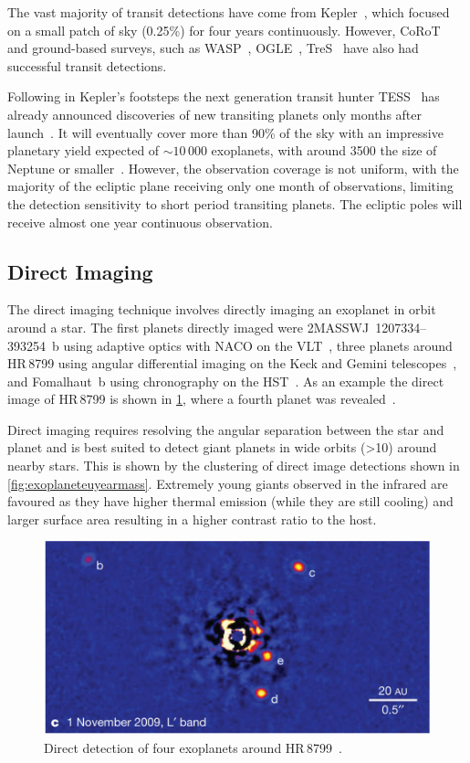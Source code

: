 The vast majority of transit detections have come from Kepler~\citep{borucki_characteristics_2011}, which focused on a small patch of sky (0.25\%) for four years continuously.
However, {CoRoT}~\citep{barge_transiting_2008} and ground-based surveys, such as WASP~\citep{pollacco_wasp_2006}, OGLE~\citep{udalski_optical_2002}, TreS~\citep{alonso_tres1_2004} have also had successful transit detections.

Following in Kepler's footsteps the next generation transit hunter {TESS}~\citep{ricker_transiting_2015} has already announced discoveries of new transiting planets only months after launch~\citep{vanderspek_tess_2018, gandolfi_tess_2018, huang_tess_2018}.
It will eventually cover more than 90\% of the sky with an impressive planetary yield expected of $\sim10\,000$ exoplanets, with around 3500 the size of Neptune or smaller~\citep{barclay_revised_2018, huang_expected_2018}.
However, the observation coverage is not uniform, with the majority of the ecliptic plane receiving only one month of observations, limiting the detection sensitivity to short period transiting planets.
The ecliptic poles will receive almost one year continuous observation.


\subsection{Direct Imaging}
\label{subsec:direct_detection}
The direct imaging technique involves directly imaging an exoplanet in orbit around a star.
The first planets directly imaged were {2MASSWJ~1207334--393254~b} using adaptive optics with NACO on the VLT~\citep{chauvin_giant_2004}, three planets around HR\,8799 using angular differential imaging on the Keck and Gemini telescopes~\citep{marois_direct_2008}, and {Fomalhaut~b} using chronography on the HST~\citep{kalas_optical_2008}.
As an example the direct image of {HR\,8799} is shown in \cref{fig:directimaging}, where a fourth planet was revealed~\citep{marois_images_2010}.

Direct imaging requires resolving the angular separation between the star and planet and is best suited to detect giant planets in wide orbits (>10\AU{}) around nearby stars.
This is shown by the clustering of direct image detections shown in \cref{fig:exoplaneteuyearmass}.
Extremely young giants observed in the infrared are favoured as they have higher thermal emission (while they are still cooling) and larger surface area resulting in a higher contrast ratio to the host.


\begin{figure}
    \centering
    \includegraphics[width=0.5\linewidth]{./figures/introduction/DirectImaging_HR8799_MaroisEtAl2010}
    \caption{Direct detection of four exoplanets around HR\,8799~\citep{marois_images_2010}.}
    \label{fig:directimaging}
\end{figure}


